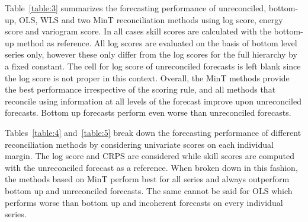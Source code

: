 \documentclass[a4paper, 11pt]{article}
\theoremstyle{theo}
\theoremstyle{definition}
\begin{document}
Table~\ref{table:3} summarizes the forecasting performance of unreconciled, bottom-up, OLS, WLS and two MinT reconciliation methods using log score, energy score and variogram score.  In all cases skill scores are calculated with the bottom-up method as reference.  All log scores are evaluated on the basis of bottom level series only, however these only differ from the log scores for the full hierarchy by a fixed constant.  The cell for log score of unreconciled forecasts is left blank since the log score is not proper in this context.  Overall, the MinT methods provide the best performance irrespective of the scoring rule, and all methods that reconcile using information at all levels of the forecast improve upon unreconciled forecasts.  Bottom up forecasts perform even worse than unreconciled forecasts.

Tables~\ref{table:4} and~\ref{table:5} break down the forecasting performance of different reconciliation methods by considering univariate scores on each individual margin. The log score and CRPS are considered while skill scores are computed with the unreconciled forecast as a reference.  When broken down in this fashion, the methods based on MinT perform best for all series and always outperform bottom up and unreconciled forecasts.  The same cannot be said for OLS which performs worse than bottom up and incoherent forecasts on every individual series.
\end{document}
